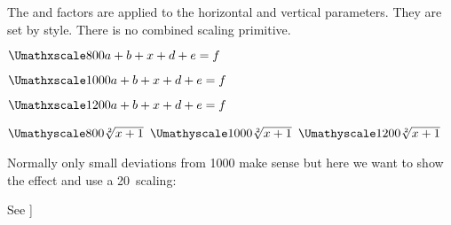 










\startnewprimitive[title={\prm {Umathxscale}}]

The  and  factors are applied to the
horizontal and vertical parameters. They are set by style. There is no combined
scaling primitive.

\startbuffer
$\Umathxscale\textstyle  800 a + b + x + d + e = f $\par
$\Umathxscale\textstyle 1000 a + b + x + d + e = f $\par
$\Umathxscale\textstyle 1200 a + b + x + d + e = f $\blank

$\Umathyscale\textstyle  800 \sqrt[2]{x+1}$\quad
$\Umathyscale\textstyle 1000 \sqrt[2]{x+1}$\quad
$\Umathyscale\textstyle 1200 \sqrt[2]{x+1}$\blank
\stopbuffer

\typebuffer

Normally only small deviations from 1000 make sense but here we want to show the
effect and use a 20\percent\ scaling:

\getbuffer

\stopnewprimitive

\startnewprimitive[title={\prm {Umathyscale}}]

See ]

\stopnewprimitive

